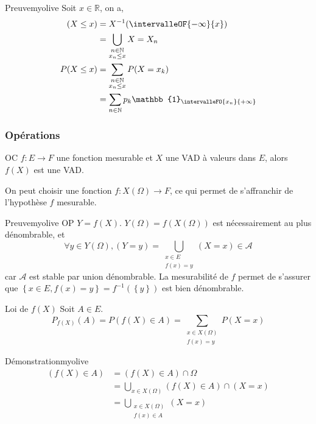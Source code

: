     \begin{demo}{Preuve}{myolive}
        Soit $x \in \mathbb{R}$, on a, 
        \begin{align*}
            (X \leq x) &= X^{-1}(\intervalleOF{-\infty}{x}) \\
            &= \bigcup_{\substack{n \in \mathbb{N} \\ x_n \leq x}} X = X_n \\
            P(X \leq x) &= \sum_{\substack{n \in \mathbb{N} \\ x_n \leq x}} P(X = x_k) \\ 
            &= \sum_{n \in \mathbb{N}} p_k \mathbb{1}_{\intervalleFO{x_n}{+\infty}}
        \end{align*}
    \end{demo}

    \subsubsection{Opérations}

    \begin{prop}{}{}
        OC $f : E \to F$ une fonction mesurable et $X$ une VAD à valeurs dans $E$, alors $f(X)$ est une VAD.
    \end{prop}

    On peut choisir une fonction $f : X(\Omega) \to F$, ce qui permet de s’affranchir de l’hypothèse $f$ mesurable.

    \begin{demo}{Preuve}{myolive}
        OP $Y = f(X)$. $Y(\Omega) = f(X(\Omega))$ est nécessairement au plus dénombrable, et 
        \[ \forall y \in Y(\Omega), (Y = y) = \bigcup_{\substack{x \in E \\ f(x) = y}} (X = x) \in \mathcal{A} \]   
        car $\mathcal{A}$ est stable par union dénombrable. La mesurabilité de $f$ permet de s’assurer que $\left\{x \in E, f(x) = y\right\} = f^{-1}(\left\{y\right\})$ est bien dénombrable.
    \end{demo}

    \begin{prop}{Loi de $f(X)$}{}
        Soit $A \in E$.
        \[ P_{f(X)}(A) = P(f(X) \in A) = \sum_{\substack{x \in X(\Omega) \\ f(x) = y}} P(X = x) \]   
    \end{prop}

    \begin{demo}{Démonstration}{myolive}
        \begin{align*}
            (f(X) \in A) &= (f(X) \in A) \cap \Omega \\
            &= \bigcup_{x \in X(\Omega)} (f(X) \in A) \cap (X = x) \\
            &= \bigcup_{\substack{x \in X(\Omega) \\ f(x) \in A}} (X = x)
        \end{align*}
    \end{demo}


